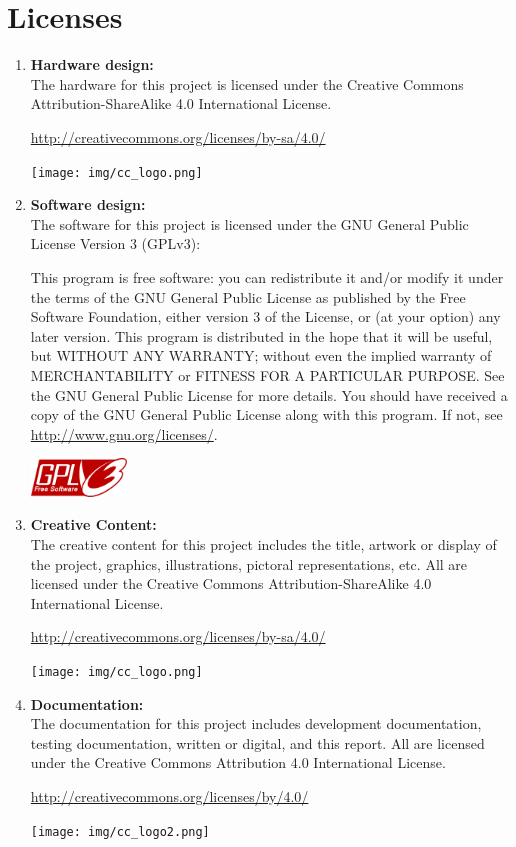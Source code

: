 \documentclass[bibtotocnumbered,abstract=on,paper=a4,fontsize=12pt,parskip=on,halfparskip=on]{scrartcl}		%
\begin{document}
\section{Licenses}
\begin{enumerate}

  \item{\textbf{Hardware design:}}\hfill \\
    The hardware for this project is licensed under the Creative Commons Attribution-ShareAlike 4.0 International License.

    \url{http://creativecommons.org/licenses/by-sa/4.0/}

    \texttt{[image: img/cc\_logo.png]}

  \item{\textbf{Software design:}}\hfill \\
    The software for this project is licensed under the GNU General Public License Version 3 (GPLv3):

    This program is free software: you can redistribute it and/or modify
    it under the terms of the GNU General Public License as published by
    the Free Software Foundation, either version 3 of the License, or
    (at your option) any later version.
    This program is distributed in the hope that it will be useful,
    but WITHOUT ANY WARRANTY; without even the implied warranty of
    MERCHANTABILITY or FITNESS FOR A PARTICULAR PURPOSE.  See the
    GNU General Public License for more details.
    You should have received a copy of the GNU General Public License
    along with this program.  If not, see \url{http://www.gnu.org/licenses/}.
      
    \includegraphics[width=1in]{img/gpl_logo.png}


    \item{\textbf{Creative Content:}}\hfill \\
    The creative content for this project includes the title, artwork or display of the project, graphics, illustrations, pictoral representations, etc. All are licensed under the Creative Commons Attribution-ShareAlike 4.0 International License.

    \url{http://creativecommons.org/licenses/by-sa/4.0/}

    \texttt{[image: img/cc\_logo.png]}\\

    \item{\textbf{Documentation:}}\hfill \\
    The documentation for this project includes development documentation, testing documentation, written or digital, and this report. All are licensed under the Creative Commons Attribution 4.0 International License.

    \url{http://creativecommons.org/licenses/by/4.0/}

    \texttt{[image: img/cc\_logo2.png]}

\end{enumerate}

\end{document}
